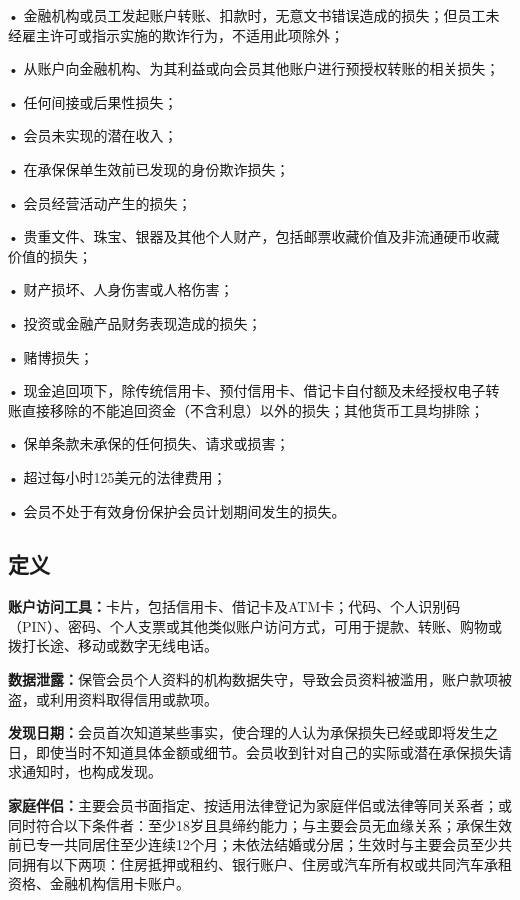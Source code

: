 \documentclass[UTF8,fontset=none,11pt,a4paper]{ctexart}
\begin{document}
• 金融机构或员工发起账户转账、扣款时，无意文书错误造成的损失；但员工未经雇主许可或指示实施的欺诈行为，不适用\allowbreak\mbox{此项除外；}


• 从账户向金融机构、为其利益或向会员其他账户进行预授权转账的\allowbreak\mbox{相关损失；}


• 任何间接或后\allowbreak\mbox{果性损失；}


• 会员未实现的\allowbreak\mbox{潜在收入；}


• 在承保保单生效前已发现的身份\allowbreak\mbox{欺诈损失；}


• 会员经营活动产\allowbreak\mbox{生的损失；}


• 贵重文件、珠宝、银器及其他个人财产，包括邮票收藏价值及非流通硬币收藏价\allowbreak\mbox{值的损失；}


• 财产损坏、人身伤害或\allowbreak\mbox{人格伤害；}


• 投资或金融产品财务表现造\allowbreak\mbox{成的损失；}


• \allowbreak\mbox{赌博损失；}


• 现金追回项下，除传统信用卡、预付信用卡、借记卡自付额及未经授权电子转账直接移除的不能追回资金（不含利息）以外的损失；其他货币工\allowbreak\mbox{具均排除；}


• 保单条款未承保的任何损失、请\allowbreak\mbox{求或损害；}


• 超过每小时125美元的\allowbreak\mbox{法律费用；}


• 会员不处于有效身份保护会员计划期间发\allowbreak\mbox{生的损失。}


\subsection*{定义}
\textbf{账户访问工具：}卡片，包括信用卡、借记卡及ATM卡；代码、个人识别码（PIN）、密码、个人支票或其他类似账户访问方式，可用于提款、转账、购物或拨打长途、移动或数字无\allowbreak\mbox{线电话。}


\textbf{数据泄露：}保管会员个人资料的机构数据失守，导致会员资料被滥用，账户款项被盗，或利用资料取得信\allowbreak\mbox{用或款项。}


\textbf{发现日期：}会员首次知道某些事实，使合理的人认为承保损失已经或即将发生之日，即使当时不知道具体金额或细节。会员收到针对自己的实际或潜在承保损失请求通知时，也\allowbreak\mbox{构成发现。}


\textbf{家庭伴侣：}主要会员书面指定、按适用法律登记为家庭伴侣或法律等同关系者；或同时符合以下条件者：至少18岁且具缔约能力；与主要会员无血缘关系；承保生效前已专一共同居住至少连续12个月；未依法结婚或分居；生效时与主要会员至少共同拥有以下两项：住房抵押或租约、银行账户、住房或汽车所有权或共同汽车承租资格、金融机构信\allowbreak\mbox{用卡账户。}
\end{document}
